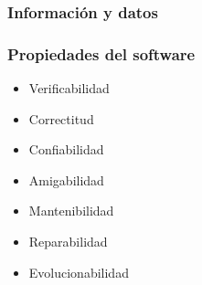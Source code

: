 

\subsubsection{Información y datos}

\subsubsection{Propiedades del software}
\begin{itemize}
    \item Verificabilidad
    \item Correctitud
    \item Confiabilidad
    \item Amigabilidad
    \item Mantenibilidad
    \item Reparabilidad
    \item Evolucionabilidad
\end{itemize}
